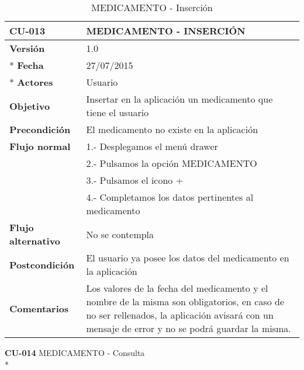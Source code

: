 \documentclass[../pfc.tex]{subfiles}
\begin{document}
		\begin{table}[H]
			\centering
			\begin{tabular}[t]{|p{3cm}|p{9.5cm}|}
				\hline \textbf{CU-013} & \textbf{MEDICAMENTO - INSERCIÓN} \\*
				\hline\hline \textbf{Versión} & 1.0 \\ *
				\hline\hline \textbf{Fecha} & 27/07/2015 \\ *
				\hline\textbf{Actores} 	& Usuario\\*
				\hline \textbf{Objetivo} & Insertar en la aplicación un medicamento que tiene el usuario\\* 			
				\hline \textbf{Precondición} & El medicamento no existe en la aplicación\\* 
				\hline \textbf{Flujo normal} & 1.- Desplegamos el menú drawer \\* 
				& 2.- Pulsamos la opción MEDICAMENTO\\*	
				& 3.- Pulsamos el icono + \\*	
				& 4.- Completamos los datos pertinentes al medicamento\\*	
				\hline \textbf{Flujo alternativo} & No se contempla \\* 
				\hline \textbf{Postcondición} & El usuario ya posee los datos del medicamento en la aplicación \\* 
				\hline \textbf{Comentarios}   & Los valores de la fecha del medicamento y el nombre de la misma son obligatorios, en caso de no ser rellenados, la aplicación avisará con un mensaje de error y no se podrá guardar la misma.\\*
				\hline
			\end{tabular}
			\caption{MEDICAMENTO - Inserción}
			\label{tabla:caso013}
		\end{table}
		
		\textbf{CU-014}	MEDICAMENTO - Consulta\\*
		
\end{document}
